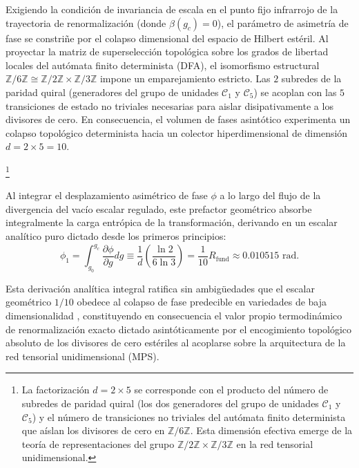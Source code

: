 \documentclass[12pt,a4paper]{article}
\theoremstyle{plain}
\theoremstyle{definition}
\theoremstyle{remark}
\begin{document}
Exigiendo la condición de invariancia de escala en el punto fijo infrarrojo de la trayectoria de renormalización (donde $\beta(g_c) = 0$), el parámetro de asimetría de fase se constriñe por el colapso dimensional del espacio de Hilbert estéril. Al proyectar la matriz de superselección topológica sobre los grados de libertad locales del autómata finito determinista (DFA), el isomorfismo estructural $\mathbb{Z}/6\mathbb{Z} \cong \mathbb{Z}/2\mathbb{Z} \times \mathbb{Z}/3\mathbb{Z}$ impone un emparejamiento estricto. Las $2$ subredes de la paridad quiral (generadores del grupo de unidades $\mathcal{C}_1$ y $\mathcal{C}_5$) se acoplan con las $5$ transiciones de estado no triviales necesarias para aislar disipativamente a los divisores de cero. En consecuencia, el volumen de fases asintótico experimenta un colapso topológico determinista hacia un colector hiperdimensional de dimensión $d = 2 \times 5 = 10$.

\footnote{La factorización $d = 2 \times 5$ se corresponde con el producto del número de subredes de paridad quiral (los dos generadores del grupo de unidades $\mathcal{C}_1$ y $\mathcal{C}_5$) y el número de transiciones no triviales del autómata finito determinista que aíslan los divisores de cero en $\mathbb{Z}/6\mathbb{Z}$. Esta dimensión efectiva emerge de la teoría de representaciones del grupo $\mathbb{Z}/2\mathbb{Z} \times \mathbb{Z}/3\mathbb{Z}$ en la red tensorial unidimensional.}

Al integrar el desplazamiento asimétrico de fase $\phi$ a lo largo del flujo de la divergencia del vacío escalar regulado, este prefactor geométrico absorbe integralmente la carga entrópica de la transformación, derivando en un escalar analítico puro dictado desde los primeros principios:
\begin{equation}
\phi_1 = \int_{g_0}^{g_c} \frac{\partial \phi}{\partial g} dg \equiv \frac{1}{d} \left( \frac{\ln 2}{6\ln 3} \right) = \frac{1}{10} R_{\text{fund}} \approx 0.010515 \text{ rad}.
\label{eq:phi1_exact_derivation}
\end{equation}

Esta derivación analítica integral ratifica sin ambigüedades que el escalar geométrico $1/10$ obedece al colapso de fase predecible en variedades de baja dimensionalidad \cite{Peinador_Emergencia_Geometria_2025}, constituyendo en consecuencia el valor propio termodinámico de renormalización exacto dictado asintóticamente por el encogimiento topológico absoluto de los divisores de cero estériles al acoplarse sobre la arquitectura de la red tensorial unidimensional (MPS).
\end{document}
